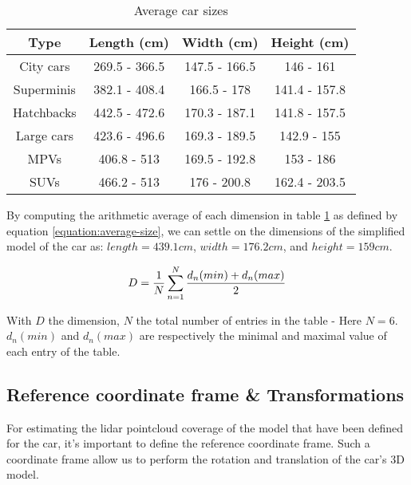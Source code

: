 \documentclass{scrartcl}
\begin{document}
    \begin{table}[!htbp]
      \centering
      \caption{Average car sizes \cite{car-sizes}}
      \begin{tabular}{ | c | c | c | c |}
        \hline
        \textbf{Type} & \textbf{Length (cm)} & \textbf{Width (cm)} & 
        \textbf{Height (cm)}  \\
        \hline \hline
        City cars & 269.5 - 366.5 & 147.5 - 166.5 & 146 - 161 \\
        \hline
        Superminis & 382.1 - 408.4 & 166.5 - 178 & 141.4 - 157.8 \\
        \hline
        Hatchbacks & 442.5 - 472.6 & 170.3 - 187.1 & 141.8 - 157.5 \\
        \hline
        Large cars & 423.6 - 496.6 & 169.3 - 189.5 & 142.9 - 155 \\
        \hline
        MPVs & 406.8 - 513 & 169.5 - 192.8 & 153 - 186 \\
        \hline
        SUVs & 466.2 - 513 & 176 - 200.8 & 162.4 - 203.5 \\
        \hline
      \end{tabular}
      \label{table:car-sizes}
    \end{table}

    By computing the arithmetic average of each dimension in table
    \ref{table:car-sizes} as defined by equation \ref{equation:average-size},
    we can settle on the dimensions of the simplified model of the car as:
    $length = 439.1 cm$, $width = 176.2 cm$, and $height = 159 cm$.

    \begin{equation}
      \centering
      D = \frac{1}{N} \sum_{n=1}^{N}{\frac{d_n(min) + d_n(max)}{2}}
      \label{equation:average-size}
    \end{equation}

    With $D$ the dimension, $N$ the total number of entries in the table -
    Here $N = 6$. $d_n(min)$ and $d_n(max)$ are respectively the minimal and
    maximal value of each entry of the table.

    \subsection{Reference coordinate frame \& Transformations}

    For estimating the lidar pointcloud coverage of the model that have been
    defined for the car, it's important to define the reference coordinate
    frame. Such a coordinate frame allow us to perform the rotation and
    translation of the car's 3D model.
\end{document}
